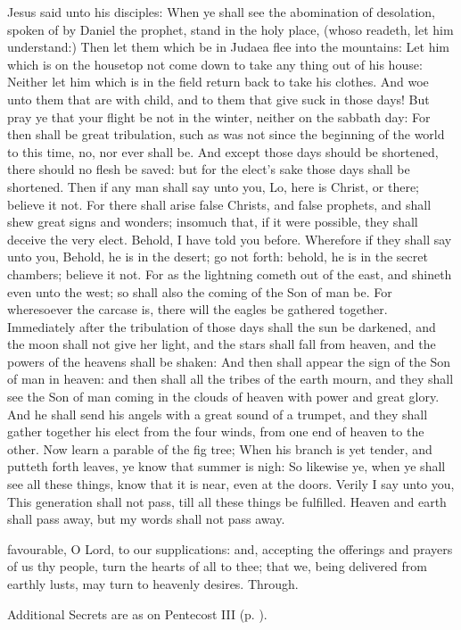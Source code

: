  Jesus said unto his disciples: When ye shall see the abomination of desolation, spoken of by Daniel the prophet, stand in the holy place, (whoso readeth, let him understand:) Then let them which be in Judaea flee into the mountains: Let him which is on the housetop not come down to take any thing out of his house: Neither let him which is in the field return back to take his clothes. And woe unto them that are with child, and to them that give suck in those days! But pray ye that your flight be not in the winter, neither on the sabbath day: For then shall be great tribulation, such as was not since the beginning of the world to this time, no, nor ever shall be. And except those days should be shortened, there should no flesh be saved: but for the elect's sake those days shall be shortened. Then if any man shall say unto you, Lo, here is Christ, or there; believe it not. For there shall arise false Christs, and false prophets, and shall shew great signs and wonders; insomuch that, if it were possible, they shall deceive the very elect. Behold, I have told you before. Wherefore if they shall say unto you, Behold, he is in the desert; go not forth: behold, he is in the secret chambers; believe it not. For as the lightning cometh out of the east, and shineth even unto the west; so shall also the coming of the Son of man be. For wheresoever the carcase is, there will the eagles be gathered together. Immediately after the tribulation of those days shall the sun be darkened, and the moon shall not give her light, and the stars shall fall from heaven, and the powers of the heavens shall be shaken: And then shall appear the sign of the Son of man in heaven: and then shall all the tribes of the earth mourn, and they shall see the Son of man coming in the clouds of heaven with power and great glory. And he shall send his angels with a great sound of a trumpet, and they shall gather together his elect from the four winds, from one end of heaven to the other. Now learn a parable of the fig tree; When his branch is yet tender, and putteth forth leaves, ye know that summer is nigh: So likewise ye, when ye shall see all these things, know that it is near, even at the doors. Verily I say unto you, This generation shall not pass, till all these things be fulfilled. Heaven and earth shall pass away, but my words shall not pass away.

\secret
{} favourable, O Lord, to our supplications: and, accepting the offerings and prayers of us thy people, turn the hearts of all to thee; that we, being delivered from earthly lusts, may turn to heavenly desires. Through.
\begin{rubric}
    Additional Secrets are as on Pentecost III (p. \pageref{PentecostIII}).
\end{rubric}

